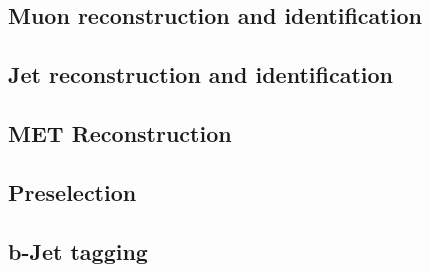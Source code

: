 \subsection{Muon reconstruction and identification} \label{sec:MuonRecoID}


\subsection{Jet reconstruction and identification} \label{sec:JetRecoID}


\subsection{MET Reconstruction} \label{sec:METReco}


\subsection{Preselection} \label{sec:Preselection}


\subsection{b-Jet tagging} \label{sec:BJetTagging}

